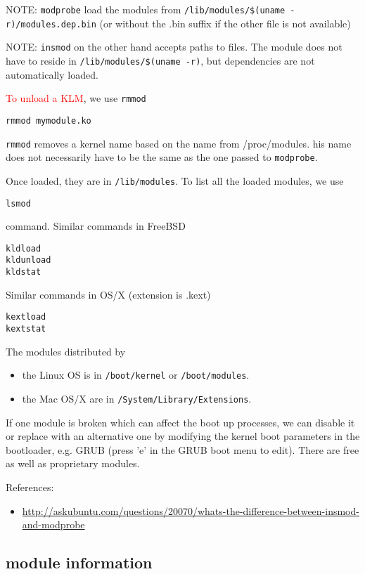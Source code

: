 NOTE: \verb!modprobe! load the modules from
\verb!/lib/modules/$(uname -r)/modules.dep.bin! (or without the .bin suffix if
the other file is not available)

NOTE: \verb!insmod! on the other hand accepts paths to files.
The module does not have to reside in \verb!/lib/modules/$(uname -r)!, but
dependencies are not automatically loaded. 

\textcolor{red}{To unload a KLM}, we use \verb!rmmod!
\begin{verbatim}
rmmod mymodule.ko
\end{verbatim}
\verb!rmmod! removes a kernel name based on the name from /proc/modules.
his name does not necessarily have to be the same as the one passed to
\verb!modprobe!.

Once loaded, they are in \verb!/lib/modules!. To list all the loaded modules, we
use
\begin{verbatim}
lsmod
\end{verbatim}
command.  Similar commands in FreeBSD
\begin{verbatim}
kldload
kldunload
kldstat
\end{verbatim}
Similar commands in OS/X (extension is .kext)
\begin{verbatim}
kextload
kextstat
\end{verbatim}
The modules distributed by 
\begin{itemize}
  \item  the Linux OS is in \verb!/boot/kernel! or
\verb!/boot/modules!. 

  \item the Mac OS/X are in \verb!/System/Library/Extensions!.
\end{itemize}

If one module is broken which can affect the boot up processes, we can disable
it or replace with an alternative one by modifying the kernel boot parameters in
the bootloader, e.g. GRUB (press 'e' in the GRUB boot menu to edit). There are
free as well as proprietary modules.

References:
\begin{itemize}
  \item
  \url{http://askubuntu.com/questions/20070/whats-the-difference-between-insmod-and-modprobe}
\end{itemize}

\subsection{module information}
\label{sec:modinfo}


